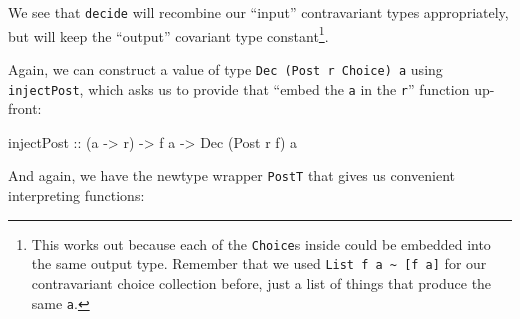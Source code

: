 \documentclass[]{article}
\newenvironment{Shaded}{}{}
\newcommand{\DataTypeTok}[1]{\textcolor[rgb]{0.56,0.13,0.00}{#1}}
\newcommand{\NormalTok}[1]{#1}
\newcommand{\OtherTok}[1]{\textcolor[rgb]{0.00,0.44,0.13}{#1}}
\begin{document}
We see that \texttt{decide} will recombine our ``input'' contravariant types
appropriately, but will keep the ``output'' covariant type constant\footnote{This
  works out because each of the \texttt{Choice}s inside could be embedded into
  the same output type. Remember that we used
  \texttt{List\ f\ a\ \textasciitilde{}\ {[}f\ a{]}} for our contravariant
  choice collection before, just a list of things that produce the same
  \texttt{a}.}.

Again, we can construct a value of type \texttt{Dec\ (Post\ r\ Choice)\ a} using
\texttt{injectPost}, which asks us to provide that ``embed the \texttt{a} in the
\texttt{r}'' function up-front:

\begin{Shaded}
\begin{Highlighting}[]
\OtherTok{injectPost ::}\NormalTok{ (a }\OtherTok{{-}>}\NormalTok{ r) }\OtherTok{{-}>}\NormalTok{ f a }\OtherTok{{-}>} \DataTypeTok{Dec}\NormalTok{ (}\DataTypeTok{Post}\NormalTok{ r f) a}
\end{Highlighting}
\end{Shaded}

And again, we have the newtype wrapper \texttt{PostT} that gives us convenient
interpreting functions:
\end{document}
